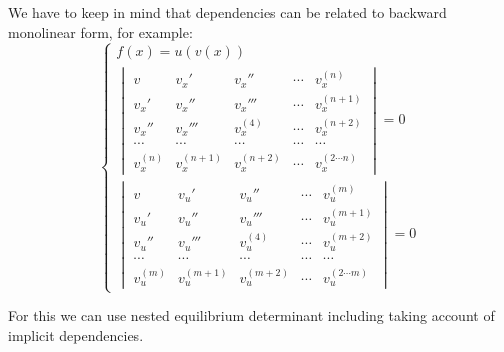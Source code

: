 \documentclass[a4paper, 11pt, oneside]{book}
\begin{document}
We have to keep in mind that dependencies can be related to backward monolinear form, for example:
\begin{equation}\label{eq:nested-monolinear-form-enclosing-example2}
  \begin{cases}
    f(x) = u(v(x)) \\
    \begin{vmatrix}
      v & v_x' & v_x'' & \cdots & v_x^{(n)} \\
      v_x' & v_x'' & v_x''' & \cdots & v_x^{(n+1)} \\
      v_x'' & v_x''' & v_x^{(4)} & \cdots & v_x^{(n+2)} \\
      \cdots & \cdots & \cdots & \cdots & \cdots \\
      v_x^{(n)} & v_x^{(n+1)} & v_x^{(n+2)} & \cdots & v_x^{(2 \cdots n)}
    \end{vmatrix} = 0 \\
    \begin{vmatrix}
      v & v_u' & v_u'' & \cdots & v_u^{(m)} \\
      v_u' & v_u'' & v_u''' & \cdots & v_u^{(m+1)} \\
      v_u'' & v_u''' & v_u^{(4)} & \cdots & v_u^{(m+2)} \\
      \cdots & \cdots & \cdots & \cdots & \cdots \\
      v_u^{(m)} & v_u^{(m+1)} & v_u^{(m+2)} & \cdots & v_u^{(2 \cdots m)}
    \end{vmatrix} = 0
  \end{cases}
\end{equation}

For this we can use nested equilibrium determinant including taking account of implicit dependencies.
\end{document}
